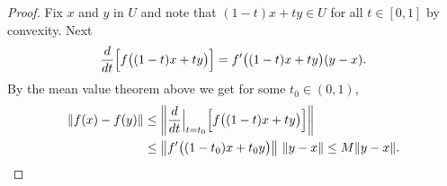 \begin{proof}
Fix $x$ and $y$ in $U$ and note that
$(1-t)x+ty \in U$ for all $t \in [0,1]$
by convexity.
Next
\begin{equation*}
\frac{d}{dt} \Bigl[f\bigl((1-t)x+ty\bigr)\Bigr]
=
f'\bigl((1-t)x+ty\bigr) (y-x) .
\end{equation*}
By the mean value theorem above we get for
some $t_0 \in (0,1)$,
\begin{equation*}
\begin{split}
\lVert {f(x)-f(y)} \rVert & \leq
\left\lVert {\frac{d}{dt} \Big|_{t=t_0} \Bigl[ f\bigl((1-t)x+ty\bigr) \Bigr] } \right\rVert
\\
& \leq
\left\lVert {f'\bigl((1-t_0)x+t_0y\bigr)} \right\rVert \, \lVert {y-x} \rVert \leq
M \lVert {y-x} \rVert . \qedhere
\end{split}
\end{equation*}
\end{proof}

